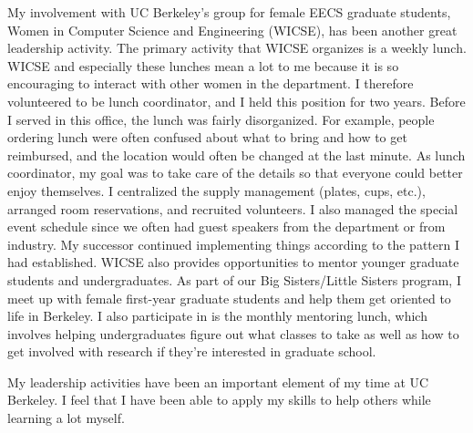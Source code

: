 \documentclass{article}
\newcommand{\eg}{{\em e.g.,}~}
\begin{document}
My involvement with UC Berkeley's group for female EECS graduate students, Women in Computer Science and Engineering (WICSE), has been another great leadership activity.
The primary activity that WICSE organizes is a weekly lunch.
WICSE and especially these lunches mean a lot to me because it is so encouraging to interact with other women in the department.
I therefore volunteered to be lunch coordinator, and I held this position for two years.
Before I served in this office, the lunch was fairly disorganized.
For example, people ordering lunch were often confused about what to bring and how to get reimbursed, and the location would often be changed at the last minute.
As lunch coordinator, my goal was to take care of the details so that everyone could better enjoy themselves.
I centralized the supply management (plates, cups, etc.), arranged room reservations, and recruited volunteers.
I also managed the special event schedule since we often had guest speakers from the department or from industry.
My successor continued implementing things according to the pattern I had established.
WICSE also provides opportunities to mentor younger graduate students and undergraduates.
As part of our Big Sisters/Little Sisters program, I meet up with female first-year graduate students and help them get oriented to life in Berkeley.
I also participate in is the monthly mentoring lunch, which involves helping undergraduates figure out what classes to take as well as how to get involved with research if they're interested in graduate school.

My leadership activities have been an important element of my time at UC Berkeley.
I feel that I have been able to apply my skills to help others while learning a lot myself.
\end{document}
